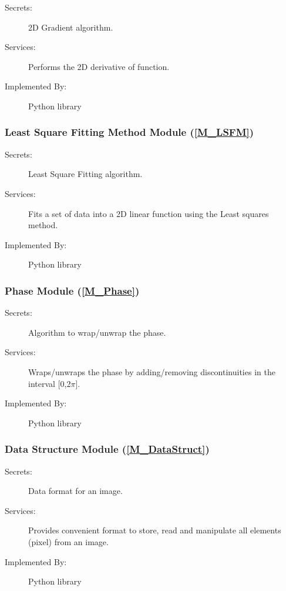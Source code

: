 \documentclass[12pt, titlepage]{article}
\begin{document}
\begin{description}
\item[Secrets:] 2D Gradient algorithm.
\item[Services:] Performs the 2D derivative of function.
\item[Implemented By:]Python library
\end{description}

\subsubsection{Least Square Fitting Method Module 
(\texorpdfstring{\cref{M_LSFM}}))}

\begin{description}
\item[Secrets:] Least Square Fitting algorithm.
\item[Services:] Fits a set of data into a 2D linear function using the Least 
squares method.
\item[Implemented By:] Python library
\end{description}

\subsubsection{Phase Module (\texorpdfstring{\cref{M_Phase}}))}

\begin{description}
\item[Secrets:] Algorithm to wrap/unwrap the phase.
\item[Services:] Wraps/unwraps the phase by adding/removing discontinuities in 
the interval [0,2$\pi$].
\item[Implemented By:]Python library
\end{description}

\subsubsection{Data Structure Module (\texorpdfstring{\cref{M_DataStruct}}))}

\begin{description}
\item[Secrets:] Data format for an image.
\item[Services:] Provides convenient format to store, read and manipulate all 
elements (pixel) from an image.
\item[Implemented By:] Python library
\end{description}
\end{document}
